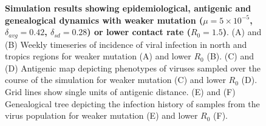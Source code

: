 \documentclass[11pt,oneside,letterpaper]{article}
\begin{document}
\vspace*{\fill}
\begin{figure}[H]
	\centering
	\caption{\textbf{Simulation results showing epidemiological, antigenic and genealogical dynamics with weaker mutation ($\mu = 5 \times 10^{-5}$, $\delta_{avg} = 0.42$, $\delta_{sd} = 0.28$) or lower contact rate ($R_0 = 1.5$)}. (A) and (B) Weekly timeseries of incidence of viral infection in north and tropics regions for weaker mutation (A) and lower $R_0$ (B). (C) and (D) Antigenic map depicting phenotypes of viruses sampled over the course of the simulation for weaker mutation (C) and lower $R_0$ (D).  Grid lines show single units of antigenic distance. (E) and (F) Genealogical tree depicting the infection history of samples from the virus population for weaker mutation (E) and lower $R_0$ (F).}
	\label{h1n1}
\end{figure}
\vspace*{\fill}

\pagebreak
\end{document}

